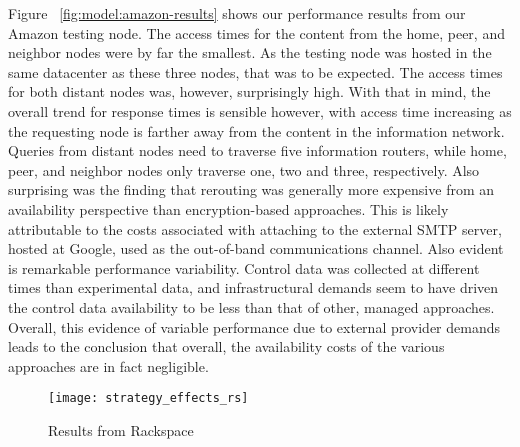 Figure ~\ref{fig:model:amazon-results} shows our performance results from our Amazon testing node.  The access times for the content from the home, peer, and neighbor nodes were by far the smallest.  As the testing node was hosted in the same datacenter as these three nodes, that was to be expected.  The access times for both distant nodes was, however, surprisingly high.  With that in mind, the overall trend for response times is sensible however, with access time increasing as the requesting node is farther away from the content in the information network.  Queries from distant nodes need to traverse five information routers, while home, peer, and neighbor nodes only traverse one, two and three, respectively.  Also surprising was the finding that rerouting was generally more expensive from an availability perspective than encryption-based approaches.  This is likely attributable to the costs associated with attaching to the external SMTP server, hosted at Google, used as the out-of-band communications channel.  Also evident is remarkable performance variability.  Control data was collected at different times than experimental data, and infrastructural demands seem to have driven the control data availability to be less than that of other, managed approaches.  Overall, this evidence of variable performance due to external provider demands leads to the conclusion that overall, the availability costs of the various approaches are in fact negligible.

\begin{figure}[!t]
\centering
\texttt{[image: strategy\_effects\_rs]}
\caption{Results from Rackspace}
\label{fig:model:rackspace-results}
\end{figure}

